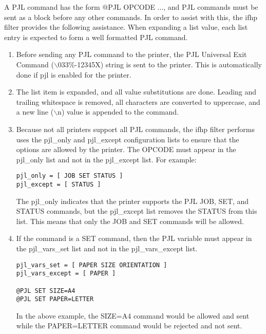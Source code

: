 \documentclass[a4paper]{article}
\begin{document}
A PJL command has the form
{\ttfamily @PJL OPCODE ...},
and PJL commands must be sent as a block before any other commands.
In order to assist with this,
the {\ttfamily ifhp} filter provides the following assistance.
When expanding a list value,
each list entry is expected to form a well formatted PJL command.
\begin{enumerate}
\item Before sending any PJL command to the printer,
the PJL Universal Exit Command
({\ttfamily $\backslash$033\%-12345X})
string is sent to the printer.
This is automatically done if {\ttfamily pjl} is enabled for the printer.
\item The list item is expanded,
and all value substitutions are done.
Leading and trailing whitespace is removed,
all characters are converted to uppercase,
and a new line ({\ttfamily $\backslash$n}) value is appended to the command.
\item Because not all printers support all PJL commands,
the {\ttfamily ifhp} filter performs uses the
{\ttfamily pjl\_only}
and
{\ttfamily pjl\_except}
configuration lists to ensure that the options are allowed by the printer.
The OPCODE must appear in the
{\ttfamily pjl\_only}
list and not in the
{\ttfamily pjl\_except}
list.
For example:
\begin{tscreen}
\begin{verbatim}
pjl_only = [ JOB SET STATUS ]
pjl_except = [ STATUS ]
\end{verbatim}
\end{tscreen}

The {\ttfamily pjl\_only} indicates that the printer supports the PJL JOB, SET, and STATUS
commands,  but the {\ttfamily pjl\_except} list removes the STATUS from this list.
This means that only the
JOB and SET commands will be allowed.

\item If the command is a {\ttfamily SET} command,
then the PJL variable must appear in the {\ttfamily pjl\_vars\_set}  list
and not in the {\ttfamily pjl\_vars\_except} list.
\begin{tscreen}
\begin{verbatim}
pjl_vars_set = [ PAPER SIZE ORIENTATION ]
pjl_vars_except = [ PAPER ]

@PJL SET SIZE=A4
@PJL SET PAPER=LETTER
\end{verbatim}
\end{tscreen}

In the above example, the {\ttfamily SIZE=A4} command would be allowed
and sent while the
{\ttfamily PAPER=LETTER} command would be rejected and not sent.

\end{enumerate}
\end{document}
